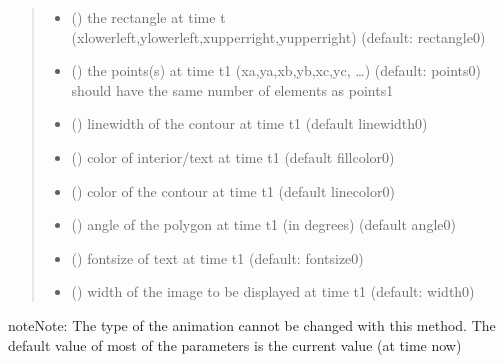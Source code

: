 \documentclass[letterpaper,10pt,english]{sphinxmanual}
\begin{document}
\begin{fulllineitems}
\begin{fulllineitems}
\begin{quote}
\begin{description}
\begin{itemize}
\item {} 
 () \textendash{} the rectangle at time t (xlowerleft,ylowerleft,xupperright,yupperright)
(default: rectangle0) 

\item {} 
 () \textendash{} the points(s) at time t1 (xa,ya,xb,yb,xc,yc, …) (default: points0) 
should have the same number of elements as points1

\item {} 
 () \textendash{} linewidth of the contour at time t1 (default linewidth0)

\item {} 
 () \textendash{} color of interior/text at time t1 (default fillcolor0)

\item {} 
 () \textendash{} color of the contour at time t1 (default linecolor0)

\item {} 
 () \textendash{} angle of the polygon at time t1 (in degrees) (default angle0)

\item {} 
 () \textendash{} fontsize of text at time t1 (default: fontsize0)

\item {} 
 () \textendash{} width of the image to be displayed at time t1 (default: width0) 

\end{itemize}

\end{description}\end{quote}

\begin{sphinxadmonition}{note}{Note:}
The type of the animation cannot be changed with this method. 
The default value of most of the parameters is the current value (at time now)
\end{sphinxadmonition}

\end{fulllineitems}


\end{fulllineitems}
\end{document}
